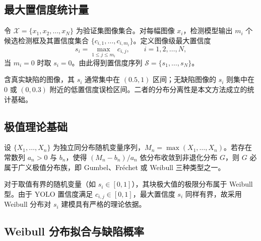 \subsection{最大置信度统计量}

\begin{definition}[最大检测置信度]
令 $\mathcal{X}=\{x_1,x_2,\ldots,x_N\}$ 为验证集图像集合。对每幅图像 $x_i$，检测模型输出 $m_i$ 个候选检测框及其置信度集合 $\{c_{i,1},\ldots,c_{i,m_i}\}$。定义图像级最大置信度
\begin{equation}
  s_i = \max_{1\le j \le m_i} c_{i,j}, \qquad i=1,2,\ldots,N,
  \label{eq:max_conf}
\end{equation}
当 $m_i=0$ 时取 $s_i=0$。由此得到置信度序列 $\mathcal{S}=\{s_1,\ldots,s_N\}$。
\end{definition}

\begin{remark}[统计直觉]
含真实缺陷的图像，其 $s_i$ 通常集中在 $(0.5,1)$ 区间；无缺陷图像的 $s_i$ 则集中在 0 或 $(0,0.3)$ 附近的低置信度误检区间。二者的分布分离性是本文方法成立的统计基础。
\end{remark}

\subsection{极值理论基础}

\begin{theorem}
\label{thm:ftg}
设 $\{X_1,\ldots,X_n\}$ 为独立同分布随机变量序列，$M_n=\max(X_1,\ldots,X_n)$。若存在常数列 $a_n>0$ 与 $b_n$，使得 $(M_n-b_n)/a_n$ 依分布收敛到非退化分布 $G$，则 $G$ 必属于广义极值分布族，即 Gumbel、Fr\'echet 或 Weibull 三种类型之一。
\cite{fisher1928,coles2001,kotz2000}
\end{theorem}

\begin{lemma}
\label{lem:weibull}
对于取值有界的随机变量（如 $s_i\in[0,1]$），其块极大值的极限分布属于 Weibull 型。由于 YOLO 置信度满足 $c_{i,j}\in[0,1]$，最大置信度 $s_i$ 同样有界，故采用 Weibull 分布对 $s_i$ 建模具有严格的理论依据。
\cite{coles2001}
\end{lemma}

\subsection{Weibull 分布拟合与缺陷概率}

